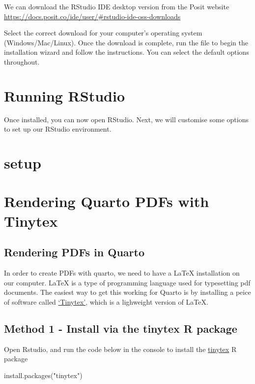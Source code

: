 \documentclass[
  letterpaper,
  DIV=11,
  numbers=noendperiod]{scrreprt}
\newenvironment{Shaded}{\begin{snugshade}}{\end{snugshade}}
\newcommand{\FunctionTok}[1]{\textcolor[rgb]{0.28,0.35,0.67}{#1}}
\newcommand{\NormalTok}[1]{\textcolor[rgb]{0.00,0.23,0.31}{#1}}
\newcommand{\StringTok}[1]{\textcolor[rgb]{0.13,0.47,0.30}{#1}}
\begin{document}
We can download the RStudio IDE desktop version from the Posit website
\url{https://docs.posit.co/ide/user/\#rstudio-ide-oss-downloads}

Select the correct download for your computer's operating system
(Windows/Mac/Linux). Once the download is complete, run the file to
begin the installation wizard and follow the instructions. You can
select the default options throughout.

\chapter{Running RStudio}\label{running-rstudio}

Once installed, you can now open RStudio. Next, we will customise some
options to set up our RStudio environment.

\chapter{setup}\label{setup}

\chapter{Rendering Quarto PDFs with
Tinytex}\label{rendering-quarto-pdfs-with-tinytex}

\section{Rendering PDFs in Quarto}\label{rendering-pdfs-in-quarto}

In order to create PDFs with quarto, we need to have a LaTeX
installation on our computer. LaTeX is a type of programming language
used for typesetting pdf documents. The easiest way to get this working
for Quarto is by installing a peice of software called
\href{https://yihui.org/tinytex/}{`Tinytex'}, which is a lighweight
version of LaTeX.

\section{Method 1 - Install via the tinytex R
package}\label{method-1---install-via-the-tinytex-r-package}

Open Rstudio, and run the code below in the console to install the
\href{https://cran.r-project.org/web/packages/tinytex/index.html}{tinytex}
R package

\begin{Shaded}
\begin{Highlighting}[]
\FunctionTok{install.packages}\NormalTok{(}\StringTok{"tinytex"}\NormalTok{)}
\end{Highlighting}
\end{Shaded}
\end{document}

